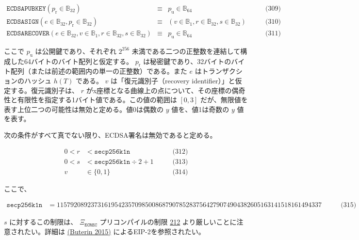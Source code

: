 \documentclass[
]{ltjsarticle}
\begin{document}
\[\begin{aligned}
\mathtt{ECDSAPUBKEY}(p_{\mathrm{r}} \in \mathbb{B}_{32}) & \equiv & p_{\mathrm{u}} \in \mathbb{B}_{64} & \qquad \text{(309)} \\
\mathtt{ECDSASIGN}(e \in \mathbb{B}_{32}, p_{\mathrm{r}} \in \mathbb{B}_{32}) & \equiv & (v \in \mathbb{B}_{1}, r \in \mathbb{B}_{32}, s \in \mathbb{B}_{32}) & \qquad \text{(310)} \\
\mathtt{ECDSARECOVER}(e \in \mathbb{B}_{32}, v \in \mathbb{B}_{1}, r \in \mathbb{B}_{32}, s \in \mathbb{B}_{32}) & \equiv & p_{\mathrm{u}} \in \mathbb{B}_{64} & \qquad \text{(311)}
\end{aligned}\]

ここで \(p_{\mathrm{u}}\) は公開鍵であり、それぞれ \(2^{256}\)
未満である二つの正整数を連結して構成した64バイトのバイト配列と仮定する。
\(p_{\mathrm{r}}\)
は秘密鍵であり、32バイトのバイト配列（または前述の範囲内の単一の正整数）である。また
\(e\) はトランザクションのハッシュ \protect\hyperlink{h_of_T}{\(h(T)\)}
である。\protect\hypertarget{v}{}{} \(v\) は「復元識別子（recovery
identifier）」と仮定する。復元識別子は、 \(r\)
がx座標となる曲線上の点について、その座標の偶奇性と有限性を指定する1バイト値である。この値の範囲は
\([0, 3]\) だが、無限値を表す上位二つの可能性は無効と定める。値0は偶数の
\(y\) 値を、値1は奇数の \(y\) 値を表す。

次の条件がすべて真でない限り、ECDSA署名は無効であると定める。

\protect\hypertarget{eq-312}{}{}\protect\hypertarget{eq-313}{}{}\protect\hypertarget{eq-314}{}{}

\[\begin{aligned}
0 < {r} &< \mathtt{secp256k1n} & \qquad \text{(312)} \\
0 < {s} &< \mathtt{secp256k1n} \div 2 + 1 & \qquad \text{(313)} \\
v &\in \{0,1\} & \qquad \text{(314)}
\end{aligned}\]

ここで、

\protect\hypertarget{eq-315}{}{}

\[\begin{aligned}
\mathtt{secp256k1n} &= 115792089237316195423570985008687907852837564279074904382605163141518161494337 & \qquad \text{(315)}
\end{aligned}\]

\(s\) に対するこの制限は、 \(\Xi_{\mathtt{ECREC}}\) プリコンパイルの制限
\protect\hyperlink{eq:ecrec_precompile_validity}{212}
より厳しいことに注意されたい。詳細は
\protect\hyperlink{ref-EIP-2}{(Buterin 2015)}
によるEIP-2を参照されたい。
\end{document}
